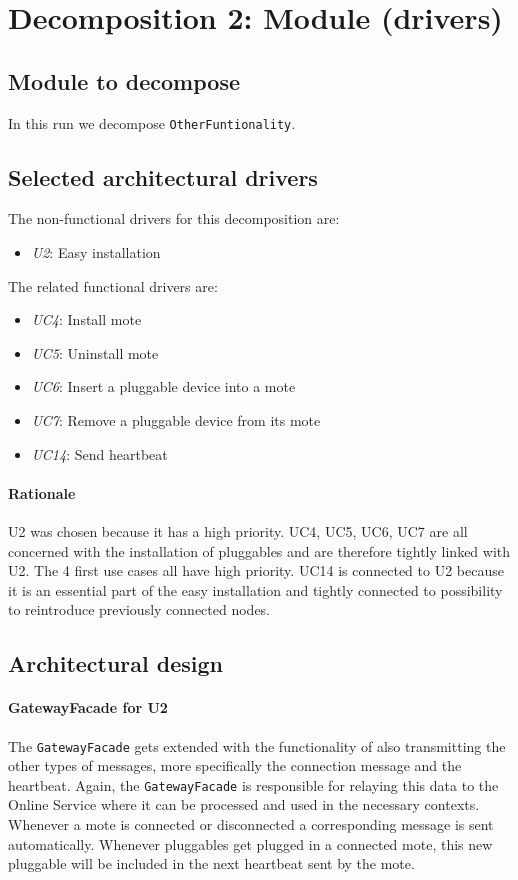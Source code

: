 \documentclass[english]{sareport}
\begin{document}
\section{Decomposition 2: Module (drivers)}
\subsection{Module to decompose}
In this run we decompose \texttt{OtherFuntionality}.
\subsection{Selected architectural drivers}
The non-functional drivers for this decomposition are:

\begin{itemize}
	\item \emph{U2}: Easy installation
\end{itemize}

The related functional drivers are:

\begin{itemize}
	\item \emph{UC4}: Install mote
	\item \emph{UC5}: Uninstall mote
	\item \emph{UC6}: Insert a pluggable device into a mote
	\item \emph{UC7}: Remove a pluggable device from its mote
	\item \emph{UC14}: Send heartbeat
\end{itemize}

\paragraph{Rationale}
U2 was chosen because it has a high priority. UC4, UC5, UC6, UC7 are all concerned with the installation of pluggables and are therefore tightly linked with U2. The 4 first use cases all have high priority. UC14 is connected to U2 because it is an essential part of the easy installation and tightly connected to possibility to reintroduce previously connected nodes.
\subsection{Architectural design}
\paragraph{GatewayFacade for U2}
The \texttt{GatewayFacade} gets extended with the functionality of also transmitting the other types of messages, more specifically the connection message and the heartbeat. Again, the \texttt{GatewayFacade} is responsible for relaying this data to the Online Service where it can be processed and used in the necessary contexts. Whenever a mote is connected or disconnected a corresponding message is sent automatically. Whenever pluggables get plugged in a connected mote, this new pluggable will be included in the next heartbeat sent by the mote.
\end{document}
